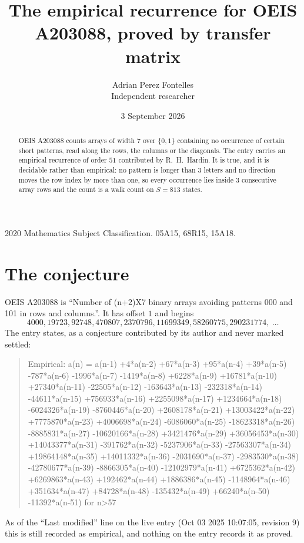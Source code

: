 \documentclass[11pt,a4paper]{article}
\title{The empirical recurrence for OEIS A203088, proved by transfer matrix}
\author{Adrian Perez Fontelles\\ \small Independent researcher}
\date{3 September 2026}
\theoremstyle{plain}
\theoremstyle{definition}
\begin{document}
\maketitle

\begin{abstract}
OEIS A203088 counts arrays of width $7$ over $\{0,1\}$ containing no occurrence of certain short
patterns, read along the rows, the columns or the diagonals. The entry carries an empirical
recurrence of order $51$ contributed by R.~H.~Hardin. It is true, and it is decidable
rather than empirical: no pattern is longer than $3$ letters and no direction moves the row
index by more than one, so every occurrence lies inside $3$ consecutive array rows and the
count is a walk count on $S=813$ states.
\end{abstract}

\noindent\small 2020 Mathematics Subject Classification. 05A15, 68R15, 15A18.\normalsize

\section{The conjecture}

OEIS A203088 is ``Number of (n+2)X7 binary arrays avoiding patterns 000 and 101 in rows and columns.''. It has offset $1$ and begins
\[
4000, 19723, 92748, 470807, 2370796, 11699349, 58260775, 290231774,\ \dots
\]
The entry states, as a conjecture contributed by its author and never marked settled:
\begin{quote}
Empirical: a(n) = a(n-1) +4*a(n-2) +67*a(n-3) +95*a(n-4) +39*a(n-5) -787*a(n-6) -1996*a(n-7) -1419*a(n-8) +6228*a(n-9) +16781*a(n-10) +27340*a(n-11) -22505*a(n-12) -163643*a(n-13) -232318*a(n-14) -44611*a(n-15) +756933*a(n-16) +2255098*a(n-17) +1234664*a(n-18) -6024326*a(n-19) -8760446*a(n-20) +2608178*a(n-21) +13003422*a(n-22) +7775870*a(n-23) +4006698*a(n-24) -6086060*a(n-25) -18623318*a(n-26) -8885831*a(n-27) -10620166*a(n-28) +3421476*a(n-29) +36056453*a(n-30) +14043377*a(n-31) -391762*a(n-32) -5237906*a(n-33) -27563307*a(n-34) +19864148*a(n-35) +14011332*a(n-36) -2031690*a(n-37) -2983530*a(n-38) -42780677*a(n-39) -8866305*a(n-40) -12102979*a(n-41) +6725362*a(n-42) +6269863*a(n-43) +192462*a(n-44) +1886386*a(n-45) -1148964*a(n-46) +351634*a(n-47) +84728*a(n-48) -135432*a(n-49) +66240*a(n-50) -11392*a(n-51) for n>57
\end{quote}
As of the ``Last modified'' line on the live entry (Oct 03 2025 10:07:05, revision 9) this is still
recorded as empirical, and nothing on the entry records it as proved.
\end{document}
